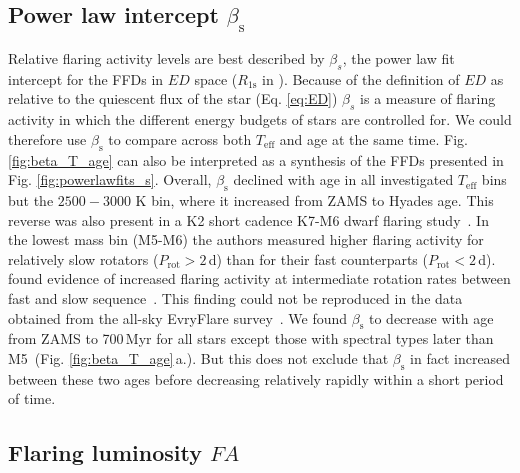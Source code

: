 \documentclass{aa}
\begin{document}
\subsection{Power law intercept $\beta_\mathrm{s}$}
Relative flaring activity levels are best described by $\beta_s$, the power law fit intercept for the FFDs in $ED$ space  ($R_\mathrm{1s}$ in \citealt{davenport2019}). Because of the definition of $ED$ as relative to the quiescent flux of the star (Eq. \ref{eq:ED}) $\beta_s$ is a measure of flaring activity in which the different energy budgets of stars are controlled for. We could therefore use $\beta_\mathrm{s}$ to compare across both $T_\mathrm{eff}$ and age at the same time. Fig. \ref{fig:beta_T_age} can also be interpreted as a synthesis of the FFDs presented in Fig. \ref{fig:powerlawfits_s}. Overall, $\beta_\mathrm{s}$ declined with age in all investigated $T_\mathrm{eff}$ bins but the $2500-3000$ K bin, where it increased from ZAMS to Hyades age. This reverse was also present in a K2 short cadence K7-M6 dwarf flaring study~\citep{raetz2020}. In the lowest mass bin (M5-M6) the authors measured higher flaring activity for relatively slow rotators ($P_\mathrm{rot} > 2\,$d) than for their fast counterparts ($P_\mathrm{rot} < 2\,$d).  
\\
\citet{mondrik2019} found evidence of increased flaring activity at intermediate rotation rates between fast and slow sequence~\citep{barnes_rotational_2003}. This finding could not be reproduced in the data obtained from the all-sky EvryFlare survey~\citep{howard2020}. We found $\beta_\mathrm{s}$ to decrease with age from ZAMS to 700\,Myr for all stars except those with spectral types later than M5~(Fig. \ref{fig:beta_T_age}\,a.). But this does not exclude that $\beta_\mathrm{s}$ in fact increased between these two ages before decreasing relatively rapidly within a short period of time.
\subsection{Flaring luminosity $FA$}
\end{document}
